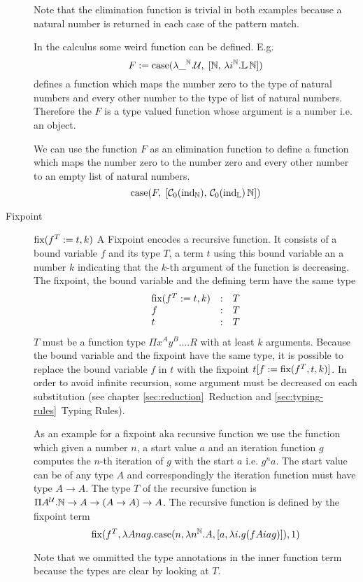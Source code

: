 \begin{description}
    Note that the elimination function is trivial in both examples because a
    natural number is returned in each case of the pattern match.

    {\def\Nat{\mathbb{N}} \def\List{\mathbb{L}}

        In the calculus some weird function can be defined. E.g.
        $$
        F :=
        \case(
            \lambda \_^\Nat. \Any, \;
            [\Nat,\, \lambda i^\Nat. \List\, \Nat]
        )
        $$
        defines a function which maps the number zero to the type of natural numbers
        and every other number to the type of list of natural numbers. Therefore the
        $F$ is a type valued function whose argument is a number i.e. an
        object.

        We can use the function $F$ as an elimination function to define a
        function which maps the number zero to the number zero and every other
        number to an empty list of natural numbers.
        $$
        \case(
            F, \;
            [\Constructor_0 (\ind_\Nat),\, \Constructor_0 (\ind_\List)\, \Nat]
        )
        $$
    }


\item[Fixpoint] $\text{fix}(f^T := t, k)$ A Fixpoint encodes a recursive function. It
  consists of a bound variable $f$ and its type $T$, a term $t$ using this
  bound variable an a number $k$ indicating that the $k$-th argument of the
  function is decreasing. The fixpoint, the bound variable and the defining term
  have the same type
  $$
  \begin{array}{lll}
    \text{fix}(f^T := t, k) &:& T
    \\
    f &:& T
    \\
    t &:& T
  \end{array}
  $$
  $T$ must be a function type $\Pi x^A y^B \ldots . R$ with at least $k$
  arguments. Because the bound variable and the fixpoint have the same type,
  it is possible to replace the bound variable $f$ in $t$ with the fixpoint
  $t[f := \text{fix}(f^T, t, k)]$. In order to avoid infinite recursion, some
  argument must be decreased on each substitution (see chapter
  \ref{sec:reduction}~Reduction and \ref{sec:typing-rules}~Typing Rules).

  { \def\Nat{\mathbb{N}}

    As an example for a fixpoint aka recursive function we use the function
    which given a number $n$, a start value $a$ and an iteration function $g$
    computes the $n$-th iteration of $g$ with the start $a$ i.e. $g^n a$. The
    start value can be of any type $A$ and correspondingly the iteration
    function must have type $A \to A$. The type $T$ of the recursive function
    is $\Pi A^\Any. \Nat \to A \to (A \to A) \to A$. The recursive function is
    defined by the fixpoint term
    $$
    \fix (
    f^T,
    \lambda A n a g.
      \case(n,
            \lambda n^\Nat. A,
            [a, \lambda i. g (f A i a g)]
      ),
      1)
    $$
  }%
  Note that we ommitted the type annotations in the inner function term
  because the types are clear by looking at $T$.


\end{description}
